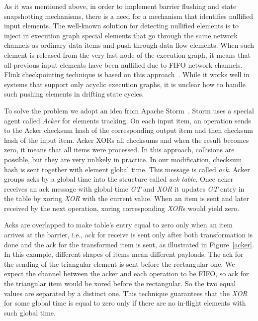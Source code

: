 As it was mentioned above, in order to implement barrier flushing and state snapshotting mechanisms, there is a need for a mechanism that identifies nullified input elements. The well-known solution for detecting nullified elements is to inject in execution graph special elements that go through the same network channels as ordinary data items and push through data flow elements. When such element is released from the very last node of the execution graph, it means that all previous input elements have been nullified due to FIFO network channels. Flink checkpointing technique is based on this approach~\cite{Carbone:2017:SMA:3137765.3137777}. While it works well in systems that support only acyclic execution graphs, it is unclear how to handle such pushing elements in drifting state cycles. 

To solve the problem we adopt an idea from Apache Storm~\cite{apache:storm}. Storm uses a special agent called {\em Acker} for elements tracking. On each input item, an operation sends to the Acker checksum hash of the corresponding output item and then checksum hash of the input item. Acker XORs all checksums and when the result becomes zero, it means that all items were processed. In this approach, collisions are possible, but they are very unlikely in practice. In our modification, checksum hash is sent together with element global time. This message is called {\it ack}. Acker groups acks by a global time into the structure called {\it ack table}. Once acker receives an ack message with global time {\it GT} and {\it XOR} it updates {\it GT} entry in the table by xoring {\it XOR} with the current value. When an item is sent and later received by the next operation, xoring corresponding {\it XOR}s would yield zero.

Acks are overlapped to make table's entry equal to zero only when an item arrives at the barrier, i.e., ack for receive is sent only after both transformation is done and the ack for the transformed item is sent, as illustrated in Figure~\ref{acker}. In this example, different shapes of items mean different payloads. The ack for the sending of the triangular element is sent before the rectangular one. We expect the channel between the acker and each operation to be FIFO, so ack for the triangular item would be xored before the rectangular. So the two equal values are separated by a distinct one. This technique guarantees that the {\it XOR} for some global time is equal to zero only if there are no in-flight elements with such global time.

